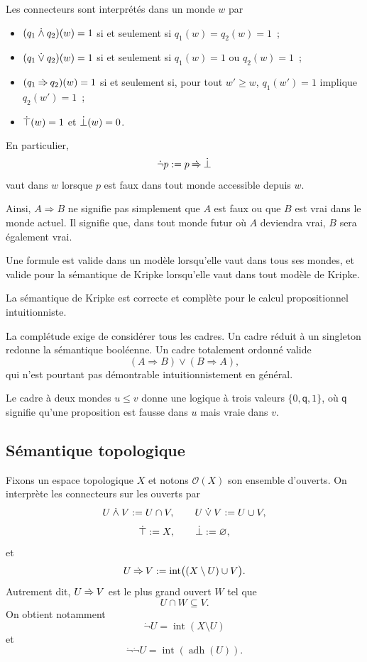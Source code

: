 \thingy Les connecteurs sont interprétés dans un monde $w$ par
\begin{itemize}
\item $(q_1\mathbin{\mathbin{\dot\land}}q_2)(w)=1$ si et seulement si
  $q_1(w)=q_2(w)=1$ ;
\item $(q_1\mathbin{\mathbin{\dot\lor}}q_2)(w)=1$ si et seulement si
  $q_1(w)=1$ ou $q_2(w)=1$ ;
\item $(q_1\mathbin{\mathbin{\dot\Rightarrow}}q_2)(w)=1$ si et seulement si, pour
  tout $w'\geq w$, $q_1(w')=1$ implique $q_2(w')=1$ ;
\item $\mathord{\dot\top}(w)=1$ et $\mathord{\dot\bot}(w)=0$.
\end{itemize}
En particulier,
\[
\dot{\neg}p
 :=p\mathbin{\mathbin{\dot\Rightarrow}}\mathord{\dot\bot}
\]
vaut dans $w$ lorsque $p$ est faux dans tout monde accessible depuis
$w$.

Ainsi, $A\Rightarrow B$ ne signifie pas simplement que $A$ est faux ou
que $B$ est vrai dans le monde actuel. Il signifie que, dans tout
monde futur où $A$ deviendra vrai, $B$ sera également vrai.

Une formule est valide dans un modèle lorsqu'elle vaut dans tous ses
mondes, et valide pour la sémantique de Kripke lorsqu'elle vaut dans
tout modèle de Kripke.

\begin{thm}[Kripke]
La sémantique de Kripke est correcte et complète pour le calcul
propositionnel intuitionniste.
\end{thm}


\thingy La complétude exige de considérer tous les cadres. Un cadre
réduit à un singleton redonne la sémantique booléenne. Un cadre
totalement ordonné valide
\[
(A\Rightarrow B)\lor(B\Rightarrow A),
\]
qui n'est pourtant pas démontrable intuitionnistement en général.

Le cadre à deux mondes $u\leq v$ donne une logique à trois valeurs
$\{0,\mathsf{q},1\}$, où $\mathsf{q}$ signifie qu'une proposition est
fausse dans $u$ mais vraie dans $v$.

\subsection{Sémantique topologique}

\thingy Fixons un espace topologique $X$ et notons $\mathcal{O}(X)$ son
ensemble d'ouverts. On interprète les connecteurs sur les ouverts par
\[
U\mathbin{\mathbin{\dot\land}}V:=U\cap V,
\qquad
U\mathbin{\mathbin{\dot\lor}}V:=U\cup V,
\]
\[
\mathord{\dot\top}:=X,
\qquad
\mathord{\dot\bot}:=\varnothing,
\]
et
\[
U\mathbin{\mathbin{\dot\Rightarrow}}V
 :=\operatorname{int}\bigl((X\setminus U)\cup V\bigr).
\]
Autrement dit, $U\mathbin{\mathbin{\dot\Rightarrow}}V$ est le plus grand ouvert $W$
tel que
\[
U\cap W\subseteq V.
\]
On obtient notamment
\[
\dot{\neg}U=\operatorname{int}(X\setminus U)
\]
et
\[
\dot{\neg}\dot{\neg}U
 =\operatorname{int}(\operatorname{adh}(U)).
\]

